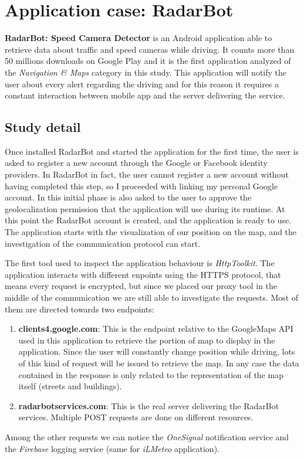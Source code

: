 \newpage
\section{Application case: RadarBot}
	\par \textbf{RadarBot: Speed Camera Detector } is an Android application able to retrieve data about traffic and speed cameras while driving. It counts more than 50 millions downloads on Google Play and it is the first application analyzed of the \textit{Navigation \& Maps} category in this study. This application will notify the user about every alert regarding the driving and for this reason it requires a constant interaction between mobile app and the server delivering the service. 
	
	\subsection{Study detail}
		\par Once installed RadarBot and started the application for the first time, the user is asked to register a new account through the Google or Facebook identity providers. In RadarBot in fact, the user cannot register a new account without having completed this step, so I proceeded with linking my personal Google account. In this initial phase is also asked to the user to approve the geolocalization permission that the application will use during its runtime. At this point the RadarBot account is created, and the application is ready to use. \newline
		The application starts with the visualization of our position on the map, and the investigation of the communication protocol can start. \newline
		\par The first tool used to inspect the application behaviour is \textit{HttpToolkit}. The application interacts with different enpoints using the HTTPS protocol, that means every request is encrypted, but since we placed our proxy tool in the middle of the communication we are still able to investigate the requests. Most of them are directed towards two endpoints:
		\begin{enumerate}
			\item \textbf{clients4.google.com}: This is the endpoint relative to the GoogleMaps API used in this application to retrieve the portion of map to display in the application. Since the user will constantly change position while driving, lots of this kind of request will be issued to retrieve the map. In any case the data contained in the response is only related to the representation of the map itself (streets and buildings).
			\item \textbf{radarbotservices.com}: This is the real server delivering the RadarBot services. Multiple POST requests are done on different resources.
		\end{enumerate}
		Among the other requests we can notice the \textit{OneSignal} notification service and the \textit{Firebase} logging service (same for \textit{iLMeteo} application).
		
